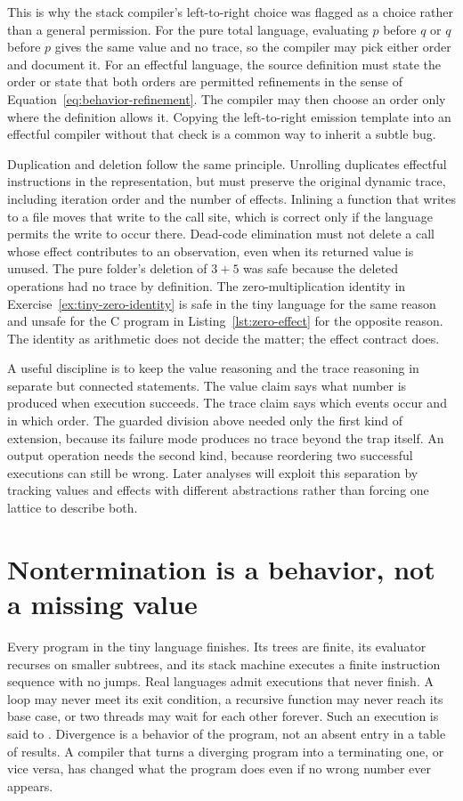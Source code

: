 This is why the stack compiler's left-to-right choice was flagged as a choice rather than a general permission.
For the pure total language, evaluating $p$ before $q$ or $q$ before $p$ gives the same value and no trace, so the compiler may pick either order and document it.
For an effectful language, the source definition must state the order or state that both orders are permitted refinements in the sense of Equation~\ref{eq:behavior-refinement}.
The compiler may then choose an order only where the definition allows it.
Copying the left-to-right emission template into an effectful compiler without that check is a common way to inherit a subtle bug.

Duplication and deletion follow the same principle.
Unrolling duplicates effectful instructions in the representation, but must preserve the original dynamic trace, including iteration order and the number of effects.
Inlining a function that writes to a file moves that write to the call site, which is correct only if the language permits the write to occur there.
Dead-code elimination must not delete a call whose effect contributes to an observation, even when its returned value is unused.
The pure folder's deletion of $3+5$ was safe because the deleted operations had no trace by definition.
The zero-multiplication identity in Exercise~\ref{ex:tiny-zero-identity} is safe in the tiny language for the same reason and unsafe for the C program in Listing~\ref{lst:zero-effect} for the opposite reason.
The identity as arithmetic does not decide the matter; the effect contract does.

A useful discipline is to keep the value reasoning and the trace reasoning in separate but connected statements.
The value claim says what number is produced when execution succeeds.
The trace claim says which events occur and in which order.
The guarded division above needed only the first kind of extension, because its failure mode produces no trace beyond the trap itself.
An output operation needs the second kind, because reordering two successful executions can still be wrong.
Later analyses will exploit this separation by tracking values and effects with different abstractions rather than forcing one lattice to describe both.

\section{Nontermination is a behavior, not a missing value}
\label{sec:trap-divergence}

Every program in the tiny language finishes.
Its trees are finite, its evaluator recurses on smaller subtrees, and its stack machine executes a finite instruction sequence with no jumps.
Real languages admit executions that never finish.
A loop may never meet its exit condition, a recursive function may never reach its base case, or two threads may wait for each other forever.
Such an execution is said to .
Divergence is a behavior of the program, not an absent entry in a table of results.
A compiler that turns a diverging program into a terminating one, or vice versa, has changed what the program does even if no wrong number ever appears.

